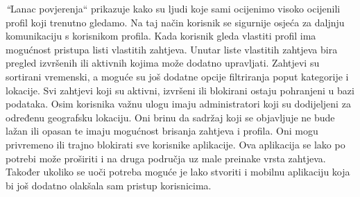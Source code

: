 		\textit “Lanac povjerenja“ prikazuje kako su ljudi koje sami ocijenimo visoko ocijenili profil koji trenutno gledamo. Na taj način korisnik se sigurnije osjeća za daljnju komunikaciju s korisnikom profila.
		\newline
Kada korisnik gleda vlastiti profil ima mogućnost pristupa listi vlastitih zahtjeva. Unutar liste vlastitih zahtjeva bira pregled izvršenih ili aktivnih kojima može dodatno upravljati. Zahtjevi su sortirani vremenski, a moguće su još dodatne opcije filtriranja poput kategorije i lokacije. Svi zahtjevi koji su aktivni, izvršeni ili blokirani ostaju pohranjeni u bazi podataka.
\newline
\eject
Osim korisnika važnu ulogu imaju administratori koji su dodijeljeni za određenu geografsku lokaciju. Oni brinu da sadržaj koji se objavljuje ne bude lažan ili opasan te imaju mogućnost brisanja zahtjeva i profila. Oni mogu privremeno ili trajno blokirati sve korisnike aplikacije.
\newline
Ova aplikacija se lako po potrebi može proširiti i na druga područja uz male preinake vrsta zahtjeva. Također ukoliko se uoči potreba moguće je lako stvoriti i mobilnu aplikaciju koja bi još dodatno olakšala sam pristup korisnicima.


		
	
